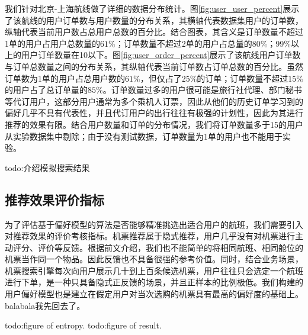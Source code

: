 我们针对北京-上海航线做了详细的数据分布统计。图\ref{fig:user_user_percent}展示了该航线的用户订单数与用户数量的分布关系，其横轴代表数据集用户的订单数，纵轴代表当前用户数占总用户总数的百分比。结合图表，其含义是订单数量不超过1单的用户占用户总数量的$61\%$；订单数量不超过2单的用户占总量的80\%；99\%以上的用户订单数量在10以下。图\ref{fig:user_order_percent}展示了该航线用户订单数与订单总数量之间的分布关系，其纵轴代表当前订单数占订单总数的百分比。虽然订单数为1单的用户占总用户数的$61\%$，但仅占了$25\%$的订单；订单数量不超过$15\%$的用户占了总订单量的$85\%$。订单数量过多的用户很可能是旅行社代理、部门秘书等代订用户，这部分用户通常为多个乘机人订票，因此从他们的历史订单学习到的偏好几乎不具有代表性，并且代订用户的出行往往有极强的计划性，因此为其进行推荐的效果有限。结合用户数量和订单的分布情况，我们将订单数量多于15的用户从实验数据集中剔除；由于没有测试数据，订单数量为1单的用户也不能用于实验。

\par todo:介绍模拟搜索结果

\subsection{推荐效果评价指标}
为了评估基于偏好模型的算法是否能够精准挑选出适合用户的航班，我们需要引入对推荐效果的评价考核指标。机票推荐属于隐式推荐，用户几乎没有对机票进行主动评分、评价等反馈。根据前文介绍，我们也不能简单的将相同航班、相同舱位的机票当作同一个物品。因此反馈也不具备很强的参考价值。同时，结合业务场景，机票搜索引擎每次向用户展示几十到上百条候选机票，用户往往只会选定一个航班进行下单，是一种只具备隐式正反馈的场景，并且正样本的比例极低。我们构建的用户偏好模型也是建立在假定用户对当次选购的机票具有最高的偏好度的基础上。balabala我先回去了。



\label{sec:base_rec}



todo:figure of entropy.
todo:figure of result.